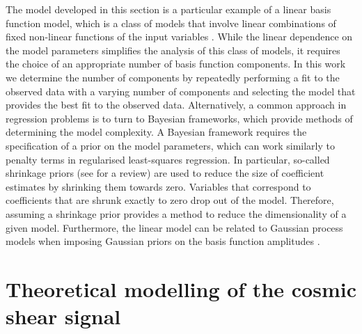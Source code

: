 \documentclass{aa}
\begin{document}
The model developed in this section is a particular example of a linear basis function model, which is a class of models that involve linear combinations of fixed non-linear functions of the input variables \citep[see for example][]{bishop}. While the linear dependence on the model parameters simplifies the analysis of this class of models, it requires the choice of an appropriate number of basis function components. In this work we determine the number of components by repeatedly performing a fit to the observed data with a varying number of components and selecting the model that provides the best fit to the observed data. Alternatively, a common approach in regression problems is to turn to Bayesian frameworks, which provide methods of determining the model complexity. A Bayesian framework requires the specification of a prior on the model parameters, which can work similarly to penalty terms in regularised least-squares regression. In particular, so-called shrinkage priors (see \citealt{vanErp20} for a review) are used to reduce the size of coefficient estimates by shrinking them towards zero. Variables that correspond to coefficients that are shrunk exactly to zero drop out of the model. Therefore, assuming a shrinkage prior provides a method to reduce the dimensionality of a given model. Furthermore, the linear model can be related to Gaussian process models when imposing Gaussian priors on the basis function amplitudes \citep[see for example][]{bishop}.

\section{Theoretical modelling of the cosmic shear signal}
\label{sec:likelihood}
\end{document}
